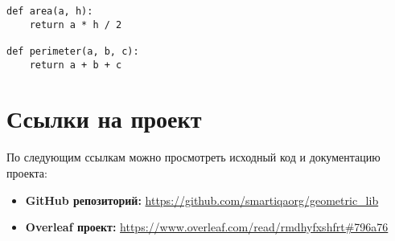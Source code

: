 \documentclass[a4paper,12pt]{article}
\begin{document}
\begin{lstlisting}[caption={Код для вычисления площади и периметра треугольника}]
def area(a, h):
    return a * h / 2

def perimeter(a, b, c):
    return a + b + c
\end{lstlisting}

\newpage

\section{Ссылки на проект}
По следующим ссылкам можно просмотреть исходный код и документацию проекта:

\begin{itemize}
    \item \textbf{GitHub репозиторий:}  
    \url{https://github.com/smartiqaorg/geometric_lib}

    \item \textbf{Overleaf проект:}  
    \url{https://www.overleaf.com/read/rmdhyfxshfrt#796a76}
\end{itemize}
\end{document}
